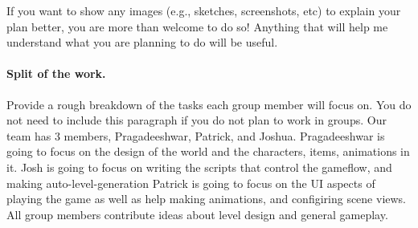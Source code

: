 \documentclass[11pt]{article}
\begin{document}
If you want to show any images (e.g., sketches, screenshots, etc) to explain your plan better, you are more than welcome to do so! Anything that will help me understand what you are planning to do will be useful.  


\paragraph{Split of the work.}
Provide  a rough breakdown of the tasks each group member will focus on. You do not need to include this paragraph if you do not plan to work in groups. 
Our team has 3 members, Pragadeeshwar, Patrick, and Joshua.
Pragadeeshwar is going to focus on the design of the world and the characters, items, animations in it. 
Josh is going to focus on writing the scripts that control the gameflow, and making auto-level-generation
Patrick is going to focus on the UI aspects of playing the game as well as help making animations, and configiring scene views.  
All group members contribute ideas about level design and general gameplay. 
\end{document}
